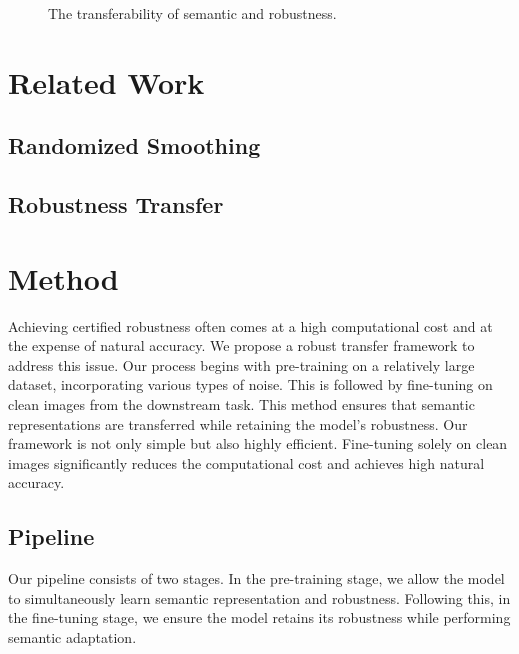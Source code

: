 \fi


\begin{figure*}  
  \centering  
    \fbox{\rule{0pt}{2in} \rule{.9\linewidth}{0pt}} 
  \caption{The transferability of semantic and robustness.}  
  \label{fig:transfer}  
\end{figure*}  




\newpage
\null

\section{Related Work}
\label{sec:related_work}

\subsection{Randomized Smoothing}

\subsection{Robustness Transfer}


\newpage




\section{Method}
\label{sec:method}
Achieving certified robustness often comes at a high computational cost and at the expense of natural accuracy. We propose a robust transfer framework to address this issue.
Our process begins with pre-training on a relatively large dataset, incorporating various types of noise. This is followed by fine-tuning on clean images from the downstream task. This method ensures that semantic representations are transferred while retaining the model's robustness.
Our framework is not only simple but also highly efficient. Fine-tuning solely on clean images significantly reduces the computational cost and achieves high natural accuracy.


\subsection{Pipeline}
Our pipeline consists of two stages. In the pre-training stage, we allow the model to simultaneously learn semantic representation and robustness. Following this, in the fine-tuning stage, we ensure the model retains its robustness while performing semantic adaptation.

